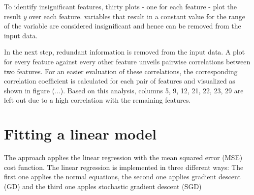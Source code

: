 \documentclass[10pt,conference,compsocconf]{IEEEtran}
\begin{document}
To identify insignificant features, thirty plots - one for each feature - plot the result \textit{y} over each feature. variables that result in a constant value for the range of the variable are considered insignificant and hence can be removed from the input data.

In the next step, redundant information is removed from the input data. A plot for every feature against every other feature unveils pairwise correlations between two features. For an easier evaluation of these correlations, the corresponding correlation coefficient is calculated for each pair of features and visualized as shown in figure (...). Based on this analysis, columns 5, 9, 12, 21, 22, 23, 29 are left out due to a high correlation with the remaining features.


\section{Fitting a linear model}
\label{sec:fitting}

The approach applies the linear regression with the mean squared error (MSE) cost function. The linear regression is implemented in three different ways: The first one applies the normal equations, the second one applies gradient descent (GD) and the third one apples stochastic gradient descent (SGD) 




%


\end{document}
